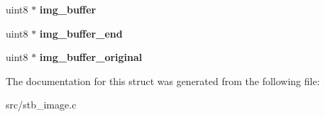 \begin{DoxyCompactItemize}
\item 
\hypertarget{structstbi_aace36d5487a596bea5faa0aef0398ac8}{}uint8 $\ast$ {\bfseries img\+\_\+buffer}\label{structstbi_aace36d5487a596bea5faa0aef0398ac8}

\item 
\hypertarget{structstbi_a55f78565e605f1784d47fc9acea475f3}{}uint8 $\ast$ {\bfseries img\+\_\+buffer\+\_\+end}\label{structstbi_a55f78565e605f1784d47fc9acea475f3}

\item 
\hypertarget{structstbi_a261be6edda817862e623972b21b4f965}{}uint8 $\ast$ {\bfseries img\+\_\+buffer\+\_\+original}\label{structstbi_a261be6edda817862e623972b21b4f965}

\end{DoxyCompactItemize}


The documentation for this struct was generated from the following file\+:\begin{DoxyCompactItemize}
\item 
src/stb\+\_\+image.\+c\end{DoxyCompactItemize}
